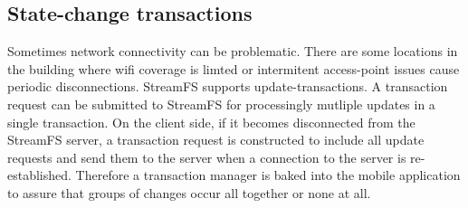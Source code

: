 \subsection{State-change transactions}
Sometimes network connectivity can be problematic.  There are some locations in the building where wifi coverage is limted or 
intermitent access-point issues cause periodic disconnections.  StreamFS supports update-transactions.  A transaction request
can be submitted to StreamFS for processingly mutliple updates in a single transaction.  On the client side, if it becomes
disconnected from the StreamFS server, a transaction request is constructed to include all update requests and send them to the
server when a connection to the server is re-established.  Therefore a transaction manager is baked into the mobile application
to assure that groups of changes occur all together or none at all.